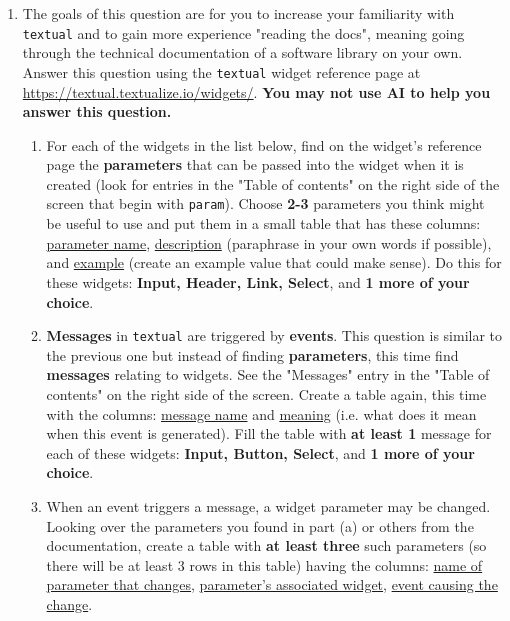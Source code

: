 \documentclass[12pt]{article}
\begin{document}
\begin{enumerate}
	\item The goals of this question are for you to increase your familiarity with \texttt{textual} and to gain more experience "reading the docs", meaning going through the technical documentation of a software library on your own. Answer this question using the \texttt{textual} widget reference page at  			\href{https://textual.textualize.io/widgets/}{https://textual.textualize.io/widgets/}. \textbf{You may not use AI to help you answer this question.}  
	\begin{enumerate}
		\item For each of the widgets in the list below, find on the widget's reference page the \textbf{parameters} that can be passed into the widget when it is created (look for entries in the "Table of contents" on the right side of the screen that begin with \texttt{param}).  Choose \textbf{2-3} parameters you think might be useful to use and put them in a small table that has these columns: \underline{parameter name}, \underline{description} (paraphrase in your own words if possible), and \underline{example} (create an example value that could make sense). Do this for these widgets: \textbf{Input, Header, Link, Select}, and \textbf{1 more of your choice}.
		\item \textbf{Messages} in \texttt{textual} are triggered by \textbf{events}. This question is similar to the previous one but instead of finding \textbf{parameters}, this time find \textbf{messages} relating to widgets. See the "Messages" entry in the "Table of contents" on the right side of the screen. Create a table again, this time with the columns: \underline{message name} and \underline{meaning} (i.e. what does it mean when this event is generated). Fill the table with \textbf{at least 1 }message for each of these widgets: \textbf{Input, Button, Select}, and \textbf{1 more of your choice}.
		\item When an event triggers a message, a widget parameter may be changed. Looking over the parameters you found in part (a) or others from the documentation, create a table with \textbf{at least three} such parameters (so there will be at least 3 rows in this table) having the columns: \underline{name of parameter that changes}, \underline{parameter's associated widget}, \underline{event causing the change}. 
	\end{enumerate}



		\end{enumerate}
\end{document}
